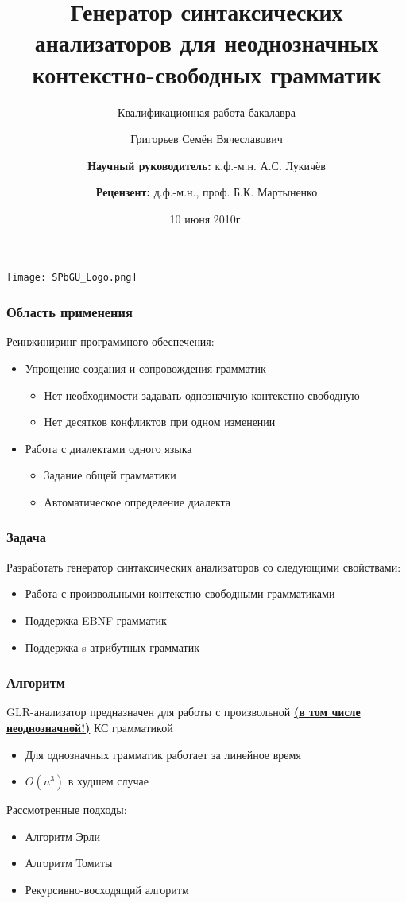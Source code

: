 \documentclass{beamer}
\title[]{Генератор синтаксических анализаторов для неоднозначных контекстно-свободных грамматик}
\subtitle[asdasd]{Квалификационная работа бакалавра}
\institute[СПбГУ]{
Санкт-Петербургский государственный университет \\
Математико-Механический факультет \\
Кафедра системного программирования }
\author[\; \; \;\; \; \;\; \; \;\; \; \;\; \; \;\; \; \;\; \; \;\; \; \;\; \; \;\; \; \;\; \; \;\; \; \;]{Григорьев Семён Вячеславович \\
  \and  
  {\bfseries Научный руководитель:} к.ф.-м.н. А.С. Лукичёв \\ 
  \and
  {\bfseries Рецензент:} д.ф.-м.н., проф. Б.К. Мартыненко  
}
\date{10 июня 2010г.}
\begin{document}
{

\begin{frame}
\begin{center}
{\texttt{[image: SPbGU\_Logo.png]}}
\end{center}
\titlepage
\end{frame}
}

\begin{frame}
	\transwipe[direction=90]
	\frametitle{Область применения}
Реинжиниринг программного обеспечения:
	\begin{itemize}
		\item Упрощение создания и сопровождения грамматик
			\begin{itemize}
				\item Нет необходимости задавать однозначную контекстно-свободную
				\item Нет десятков конфликтов при одном изменении
			\end{itemize}
		\item Работа с диалектами одного языка
			\begin{itemize}
				\item Задание общей грамматики
				\item Автоматическое определение диалекта
			\end{itemize}		
	\end{itemize}
\end{frame}


\begin{frame}
	\transwipe[direction=90]
	\frametitle{Задача}
	Разработать генератор синтаксических анализаторов со следующими свойствами:  
	\begin{itemize}
		\item Работа с произвольными контекстно-свободными грамматиками
		\item Поддержка EBNF-грамматик
		\item Поддержка s-атрибутных грамматик
	\end{itemize}
\end{frame}

\begin{frame}
	\transwipe[direction=90]
	\frametitle{Алгоритм}
	 GLR-анализатор предназначен для работы с произвольной {\bfseries{\underline {(в том числе неоднозначной!)}}} КС  грамматикой
	\begin{itemize}
		\item Для однозначных грамматик работает за линейное время
    \item {$O(n^{3})$ в худшем случае}
	\end{itemize}
	Рассмотренные подходы:
	\begin{itemize}
			\item Алгоритм Эрли				
			\item Алгоритм Томиты				
			\item Рекурсивно-восходящий алгоритм				
	\end{itemize}					
\end{frame}
\end{document}
